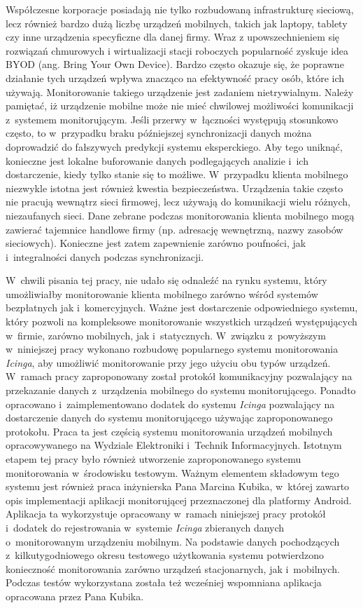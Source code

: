 Współczesne korporacje posiadają nie tylko rozbudowaną infrastrukturę
sieciową, lecz również bardzo dużą liczbę urządzeń mobilnych, takich
jak laptopy, tablety czy inne urządzenia specyficzne dla danej
firmy. Wraz z upowszechnieniem się rozwiązań chmurowych i
wirtualizacji stacji roboczych popularność zyskuje idea BYOD
(ang. Bring Your Own Device). Bardzo często okazuje się, że poprawne
działanie tych urządzeń wpływa znacząco na efektywność pracy osób,
które ich używają. Monitorowanie takiego urządzenie jest zadaniem
nietrywialnym. Należy pamiętać, iż urządzenie mobilne może nie mieć
chwilowej możliwości komunikacji z~systemem monitorującym. Jeśli
przerwy w~łączności występują stosunkowo często, to w~przypadku braku
późniejszej synchronizacji danych można doprowadzić do fałszywych
predykcji systemu eksperckiego. Aby tego uniknąć, konieczne jest
lokalne buforowanie danych podlegających analizie i~ich dostarczenie,
kiedy tylko stanie się to możliwe. W~przypadku klienta mobilnego
niezwykle istotna jest również kwestia bezpieczeństwa. Urządzenia
takie często nie pracują wewnątrz sieci firmowej, lecz używają do
komunikacji wielu różnych, niezaufanych sieci. Dane zebrane podczas
monitorowania klienta mobilnego mogą zawierać tajemnice handlowe firmy
(np. adresację wewnętrzną, nazwy zasobów sieciowych). Konieczne jest
zatem zapewnienie zarówno poufności, jak i~integralności danych
podczas synchronizacji.

W~chwili pisania tej pracy, nie udało się odnaleźć na rynku systemu,
który umożliwiałby monitorowanie klienta mobilnego zarówno wśród
systemów bezpłatnych jak i~komercyjnych. Ważne jest dostarczenie
odpowiedniego systemu, który pozwoli na kompleksowe monitorowanie
wszystkich urządzeń występujących w~firmie, zarówno mobilnych, jak
i~statycznych. W~związku z~powyższym w~niniejszej pracy wykonano
rozbudowę popularnego systemu monitorowania {\em Icinga}, aby umożliwić
monitorowanie przy jego użyciu obu typów urządzeń. W~ramach pracy
zaproponowany został protokół komunikacyjny pozwalający na przekazanie
danych z~urządzenia mobilnego do systemu monitorującego. Ponadto
opracowano i~zaimplementowano dodatek do systemu {\em Icinga} pozwalający na
dostarczenie danych do systemu monitorującego używając zaproponowanego
protokołu. Praca ta jest częścią systemu monitorowania urządzeń
mobilnych opracowywanego na Wydziale Elektroniki i~Technik
Informacyjnych. Istotnym etapem tej pracy było również utworzenie
zaproponowanego systemu monitorowania w~środowisku testowym. Ważnym
elementem składowym tego systemu jest również praca inżynierska Pana
Marcina Kubika\cite{book:pracaKubika}, w~której zawarto opis
implementacji aplikacji monitorującej przeznaczonej dla platformy
Android. Aplikacja ta wykorzystuje opracowany w~ramach niniejszej
pracy protokół i~dodatek do rejestrowania w~systemie {\em Icinga} zbieranych
danych o~monitorowanym urządzeniu mobilnym. Na podstawie danych
pochodzących z~kilkutygodniowego okresu testowego użytkowania systemu
potwierdzono konieczność monitorowania zarówno urządzeń stacjonarnych,
jak i~mobilnych. Podczas testów wykorzystana została też wcześniej
wspomniana aplikacja opracowana przez Pana Kubika.

